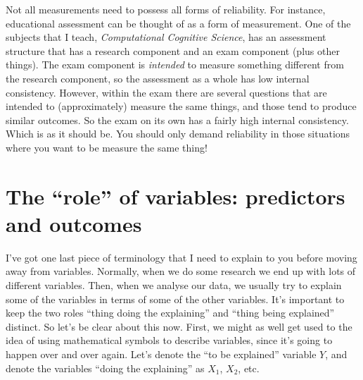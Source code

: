 Not all measurements need to possess all forms of reliability. For instance, educational assessment can be thought of as a form of measurement. One of the subjects that I teach, {\it Computational Cognitive Science}, has an assessment structure that has a research component and an exam component (plus other things). The exam component is {\it intended} to measure something different from the research component, so the assessment as a whole has low internal consistency. However, within the exam there are several questions that are intended to (approximately) measure the same things, and those tend to produce similar outcomes. So the exam on its own has a fairly high internal consistency. Which is as it should be. You should only demand reliability in those situations where you want to be measure the same thing!


\section{The ``role'' of variables: predictors and outcomes \label{sec:ivdv}}

I've got one last piece of terminology that I need to explain to you before moving away from variables. Normally, when we do some research we end up with lots of different variables. Then, when we analyse our data, we usually try to explain some of the variables in terms of some of the other variables. It's important to keep the two roles ``thing doing the explaining'' and ``thing being explained'' distinct. So let's be clear about this now. First, we might as well get used to the idea of using mathematical symbols to describe variables, since it's going to happen over and over again. Let's denote the ``to be explained'' variable $Y$, and denote the variables ``doing the explaining'' as $X_1$, $X_2$, etc. 

